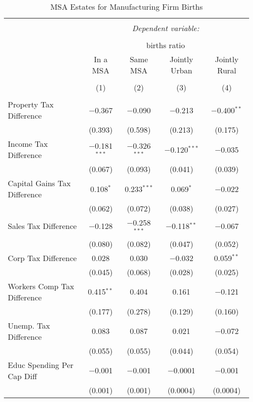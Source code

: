
\begin{table}[!htbp] \centering 
  \caption{MSA Estates for  Manufacturing Firm Births} 
  \label{31-33metro} 
\begin{tabular}{@{\extracolsep{5pt}}lcccc} 
\\[-1.8ex]\hline 
\hline \\[-1.8ex] 
 & \multicolumn{4}{c}{\textit{Dependent variable:}} \\ 
\cline{2-5} 
\\[-1.8ex] & \multicolumn{4}{c}{births ratio} \\ 
 & In a MSA & Same MSA & Jointly Urban & Jointly Rural \\ 
\\[-1.8ex] & (1) & (2) & (3) & (4)\\ 
\hline \\[-1.8ex] 
 Property Tax Difference & $-$0.367 & $-$0.090 & $-$0.213 & $-$0.400$^{**}$ \\ 
  & (0.393) & (0.598) & (0.213) & (0.175) \\ 
  Income Tax Difference & $-$0.181$^{***}$ & $-$0.326$^{***}$ & $-$0.120$^{***}$ & $-$0.035 \\ 
  & (0.067) & (0.093) & (0.041) & (0.039) \\ 
  Capital Gains Tax Difference & 0.108$^{*}$ & 0.233$^{***}$ & 0.069$^{*}$ & $-$0.022 \\ 
  & (0.062) & (0.072) & (0.038) & (0.027) \\ 
  Sales Tax Difference & $-$0.128 & $-$0.258$^{***}$ & $-$0.118$^{**}$ & $-$0.067 \\ 
  & (0.080) & (0.082) & (0.047) & (0.052) \\ 
  Corp Tax Difference & 0.028 & 0.030 & $-$0.032 & 0.059$^{**}$ \\ 
  & (0.045) & (0.068) & (0.028) & (0.025) \\ 
  Workers Comp Tax Difference & 0.415$^{**}$ & 0.404 & 0.161 & $-$0.121 \\ 
  & (0.177) & (0.278) & (0.129) & (0.160) \\ 
  Unemp. Tax Difference & 0.083 & 0.087 & 0.021 & $-$0.072 \\ 
  & (0.055) & (0.055) & (0.044) & (0.054) \\ 
  Educ Spending Per Cap Diff & $-$0.001 & $-$0.001 & $-$0.0001 & $-$0.001 \\ 
  & (0.001) & (0.001) & (0.0004) & (0.0004) \\ 

\end{tabular}
\end{table}
